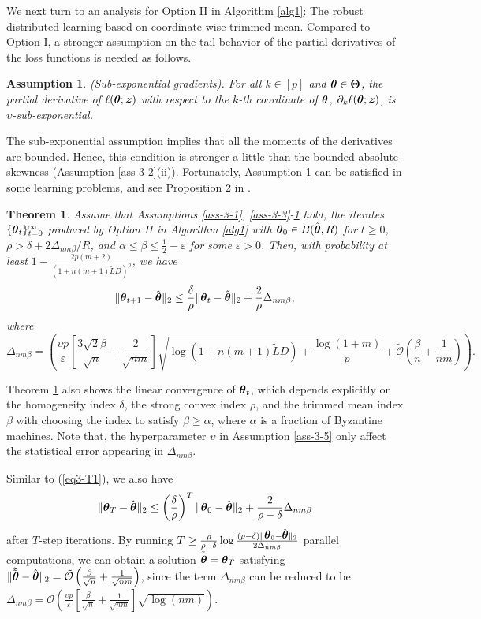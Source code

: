 \documentclass[12pt,a4paper]{article}%
\newtheorem{thm}{Theorem}[section]
\newtheorem{ass}{Assumption}[section]
\newcommand \vc[1]{{\mbox{\boldmath${#1}$}}}
\newcommand \vtheta{\vc \theta}
\newcommand \vZ{\vc z}
\numberwithin{equation}{section}
\newcommand{\sbr}[1]{\left(#1\right)}        %
\newcommand{\mbr}[1]{\left[#1\right]}        %
\begin{document}
We next turn to an analysis for Option II in Algorithm \ref{alg1}:  The robust distributed learning based on coordinate-wise trimmed mean. Compared to Option I, a stronger assumption on the tail behavior of the partial derivatives of the loss functions is needed as follows.
\begin{ass}\label{ass-3-5}
(Sub-exponential gradients). For all $k\in[p]$ and $\vtheta\in \vc \Theta$, the partial derivative of $\ell(\vtheta;\vZ)$ with respect to the $k$-th coordinate of $\vtheta$, $\partial_k\ell(\vtheta;\vZ)$, is $\upsilon$-sub-exponential.
\end{ass}
The sub-exponential assumption implies that all the moments of the derivatives are bounded. Hence, this  condition is stronger a little than the bounded absolute skewness (Assumption \ref{ass-3-2}(ii)). Fortunately, {Assumption \ref{ass-3-5} can be satisfied in some learning problems, and see Proposition 2 in \cite{YinChenRB2018}.}

\begin{thm}\label{thm2}
Assume that Assumptions \ref{ass-3-1}, \ref{ass-3-3}-\ref{ass-3-5} hold, the iterates $\{\vtheta_t\}_{t=0}^\infty$ produced by Option II in Algorithm \ref{alg1} with $\vtheta_0\in B(\hat{\vtheta}, R)$ for $t\geq0$, $\rho>\delta+2\Delta_{nm\beta}/R$, and $\alpha\leq \beta\leq \frac{1}{2}-\varepsilon$ for some $\varepsilon>0$. Then, with probability at least $1-\frac{2p(m+2)}{(1+n(m+1)\tilde{L}D)^p}$, we have
$$\|\vtheta_{t+1}-\hat{\vtheta}\|_2\leq \frac{\delta}{\rho}\|\vtheta_{t}-\hat{\vtheta}\|_2+\frac{2}{\rho}\Delta_{nm\beta},$$
where
$$\Delta_{nm\beta}=\sbr{\frac{\upsilon p}{\varepsilon}\mbr{\frac{3\sqrt{2}\beta}{\sqrt{n}}+\frac{2}{\sqrt{nm}}}\sqrt{\log(1+n(m+1)\tilde{L}D)+\frac{\log (1+m)}{p}}+\mathcal{\tilde{O}}\sbr{\frac{\beta}{n}+\frac{1}{nm}}}.
$$
\end{thm}

Theorem \ref{thm2} also shows the linear convergence of $\vtheta_t$, which depends explicitly on the homogeneity index $\delta$, the strong convex index $\rho$, and the trimmed mean index $\beta$ with choosing the index to satisfy $\beta\geq\alpha$, where $\alpha$ is a
fraction of Byzantine machines. Note that, the hyperparameter $\upsilon$ in Assumption \eqref{ass-3-5} only affect the statistical error appearing in $\Delta_{nm\beta}$.

 Similar to (\ref{eq3-T1}), we also have
$$
\|\vtheta_T-\hat{\vtheta}\|_2\leq \sbr{\frac{\delta}{\rho}}^T\|\vtheta_{0}-\hat{\vtheta}\|_2+\frac{2}{\rho-\delta}\Delta_{nm\beta}
$$
after $T$-step iterations.
 By running $T\geq\frac{\rho}{\rho-\delta}\log \frac{(\rho-\delta)\|\vtheta_{0}-\hat{\vtheta}\|_2}{2\Delta_{nm\beta}}$ parallel computations, we can obtain a solution $\tilde{\tilde{\vtheta}}=\vtheta_T$ satisfying $\|\tilde{\tilde{\vtheta}}-\hat{\vtheta}\|_2=\mathcal{\tilde{O}}\sbr{\frac{\beta}{\sqrt{n}}+\frac{1}{\sqrt{nm}}}$,
 since the term $\Delta_{nm\beta}$ can be reduced to be
 $\Delta_{nm\beta}=\mathcal{O}\sbr{\frac{\upsilon p}{\varepsilon}\mbr{\frac{\beta}{\sqrt{n}}+\frac{1}{\sqrt{nm}}}\sqrt{\log(nm)}}$.
\end{document}
